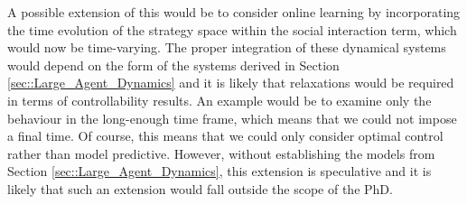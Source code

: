 \documentclass[.../main.tex]{subfiles}
\begin{document}
	A possible extension of this would be to consider online learning by incorporating the time
	evolution of the strategy space within the social interaction term, which would now be
	time-varying. The proper integration of these dynamical systems would depend on the form of the
	systems derived in Section \ref{sec::Large_Agent_Dynamics} and it is likely that relaxations would
	be required in terms of controllability results. An example would be to examine only the
	behaviour in the long-enough time frame, which means that we could not impose a final time. Of
	course, this means that we could only consider optimal control rather than model predictive.
	However, without establishing the models from Section \ref{sec::Large_Agent_Dynamics}, this
	extension is speculative and it is likely that such an extension would fall outside the scope of
	the PhD.

\end{document}
